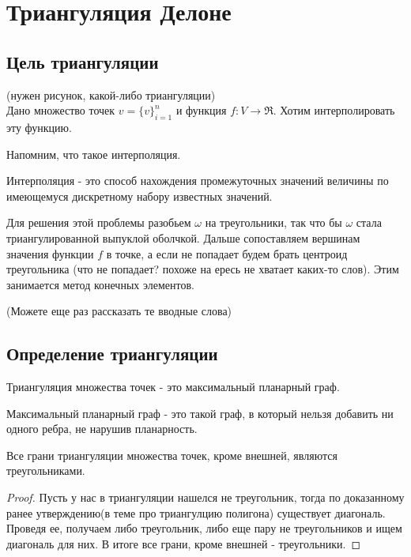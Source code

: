 \section[title]{Триангуляция Делоне}

\subsection[title]{Цель триангуляции}
(нужен рисунок, какой-либо триангуляции) \\
Дано множество точек $v = \{v\}_{i=1}^{n}$ и функция $f:V\rightarrow \Re$. Хотим интерполировать эту функцию.  

Напомним, что такое интерполяция.
 
\begin{definition} 
Интерполяция - это способ нахождения промежуточных значений величины по имеющемуся дискретному набору известных значений.
\end{definition}

Для решения этой проблемы разобьем $\omega$ на треугольники, так что бы $\omega$ стала триангулированной выпуклой оболчкой. 
Дальше сопоставляем вершинам значения функции $f$ в точке, а если не попадает будем брать центроид треугольника (что не попадает? похоже на ересь не хватает каких-то слов).
Этим занимается метод конечных элементов.

(Можете еще раз рассказать те вводные слова)

\subsection[title]{Определение триангуляции}
\begin{definition} 
Триангуляция множества точек - это максимальный планарный граф.
\end{definition}

\begin{definition} 
Максимальный планарный граф - это такой граф, в который нельзя добавить ни одного ребра, не нарушив планарность. 
\end{definition}

\begin{statement}
Все грани триангуляции множества точек, кроме внешней, являются треугольниками.
\begin{proof} 
Пусть у нас в триангуляции нашелся не треугольник, тогда по доказанному ранее утверждению(в теме про триангулцию полигона) существует диагональ. 
Проведя ее, получаем либо треугольник, либо еще пару не треугольников и ищем диагональ для них. В итоге все грани, кроме внешней - треугольники. 
\end{proof}
\end{statement}

